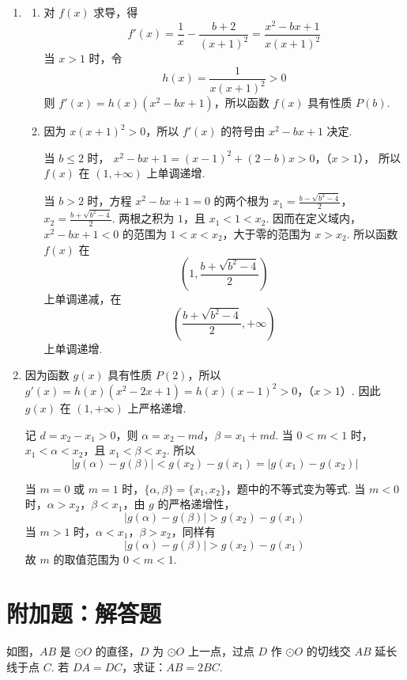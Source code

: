 \begin{solution}
\begin{enumerate}
\item
\begin{enumerate}
\item 对 \(f(x)\) 求导，得
\[
f'(x)=\frac{1}{x}-\frac{b+2}{(x+1)^2}
=\frac{x^2-bx+1}{x(x+1)^2}
\]
当 \(x>1\) 时，令
\[
h(x)=\frac{1}{x(x+1)^2}>0
\]
则 \(f'(x)=h(x)(x^2-bx+1)\)，所以函数 \(f(x)\) 具有性质 \(P(b)\).

\item 因为 \(x(x+1)^2>0\)，所以 \(f'(x)\) 的符号由 \(x^2-bx+1\) 决定.

当 \(b\leqslant2\) 时，
\(x^2-bx+1=(x-1)^2+(2-b)x>0\)，（\(x>1\)），
所以 \(f(x)\) 在 \((1,+\infty)\) 上单调递增.

当 \(b>2\) 时，方程 \(x^2-bx+1=0\) 的两个根为 \(x_1=\frac{b-\sqrt{b^2-4}}{2}\)，\(x_2=\frac{b+\sqrt{b^2-4}}{2}\).
两根之积为 \(1\)，且 \(x_1<1<x_2\). 因而在定义域内，\(x^2-bx+1<0\) 的范围为 \(1<x<x_2\)，大于零的范围为 \(x>x_2\). 所以函数 \(f(x)\) 在
\[
\left(1,\frac{b+\sqrt{b^2-4}}{2}\right)
\]
上单调递减，在
\[
\left(\frac{b+\sqrt{b^2-4}}{2},+\infty\right)
\]
上单调递增.
\end{enumerate}

\item 因为函数 \(g(x)\) 具有性质 \(P(2)\)，所以
\(g'(x)=h(x)(x^2-2x+1)=h(x)(x-1)^2>0\)，（\(x>1\)）.
因此 \(g(x)\) 在 \((1,+\infty)\) 上严格递增.

记 \(d=x_2-x_1>0\)，则 \(\alpha=x_2-md\)，\(\beta=x_1+md\).
当 \(0<m<1\) 时，\(x_1<\alpha<x_2\)，且 \(x_1<\beta<x_2\). 所以
\[
|g(\alpha)-g(\beta)|<g(x_2)-g(x_1)=|g(x_1)-g(x_2)|
\]

当 \(m=0\) 或 \(m=1\) 时，\(\{\alpha,\beta\}=\{x_1,x_2\}\)，题中的不等式变为等式. 当 \(m<0\) 时，\(\alpha>x_2\)，\(\beta<x_1\)，由 \(g\) 的严格递增性，
\[
|g(\alpha)-g(\beta)|>g(x_2)-g(x_1)
\]
当 \(m>1\) 时，\(\alpha<x_1\)，\(\beta>x_2\)，同样有
\[
|g(\alpha)-g(\beta)|>g(x_2)-g(x_1)
\]
故 \(m\) 的取值范围为 \(0<m<1\).
\end{enumerate}
\end{solution}

\section{附加题：解答题}

\begin{problem}[A]
如图，\(AB\) 是 \(\odot O\) 的直径，\(D\) 为 \(\odot O\) 上一点，过点 \(D\) 作 \(\odot O\) 的切线交 \(AB\) 延长线于点 \(C\). 若 \(DA=DC\)，求证：\(AB=2BC\).

\end{problem}

